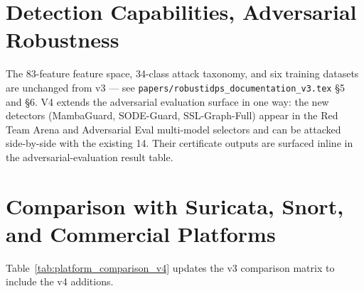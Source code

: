 \documentclass[11pt,a4paper]{article}
\begin{document}
\section{Detection Capabilities, Adversarial Robustness}
\label{sec:detection_etc}

The 83-feature feature space, 34-class attack taxonomy, and six
training datasets are unchanged from v3 --- see
\texttt{papers/robustidps\_documentation\_v3.tex} \S5 and \S6.  V4
extends the adversarial evaluation surface in one way: the new
detectors (MambaGuard, SODE-Guard, SSL-Graph-Full) appear in the
Red Team Arena and Adversarial Eval multi-model selectors and can be
attacked side-by-side with the existing 14.  Their certificate
outputs are surfaced inline in the adversarial-evaluation result
table.

\section{Comparison with Suricata, Snort, and Commercial Platforms}
\label{sec:comparison}

Table~\ref{tab:platform_comparison_v4} updates the v3 comparison
matrix to include the v4 additions.
\end{document}
